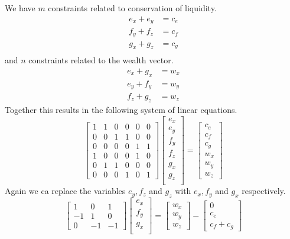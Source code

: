 \documentclass[10pt,twocolumn]{article}
\begin{document}
We have $m$ constraints related to conservation of liquidity.
\begin{align*}
  e_x + e_y  & = c_e \\
  f_y + f_z & = c_f \\
  g_x + g_z & = c_g \\
\end{align*}
and $n$ constraints related to the wealth vector.
\begin{align*}
  e_x +  g_x & = w_x \\
  e_y +  f_y & = w_y \\
  f_z +  g_z & = w_z
\end{align*}
Together this results in the following system of linear equations.
\[
  \left[
    \begin{array}{cccccc}
      1 & 1 & 0 & 0 & 0 & 0 \\
      0 & 0 & 1 & 1 & 0 & 0 \\
      0 & 0 & 0 & 0 & 1 & 1 \\
      1 & 0 & 0 & 0 & 1 & 0 \\
      0 & 1 & 1 & 0 & 0 & 0 \\
      0 & 0 & 0 & 1 & 0 & 1 
    \end{array}
    \right]
\begin{bmatrix}
  e_{x}  \\
  e_{y}  \\
  f_{y}  \\
  f_{z}  \\
  g_{x}  \\
  g_{z}  \\
\end{bmatrix} 
  = \begin{bmatrix}
  c_e\\
  c_f\\
  c_g\\
  w_x\\
  w_y\\
  w_z
\end{bmatrix}
\]
Again we ca replace the variables $e_y, f_z$ and $g_z$ with $e_x, f_y$ and $g_x$ respectively. 
\[
  \left[
    \begin{array}{ccc}
      1 & 0 & 1 \\
      - 1& 1 & 0 \\
      0 & -1 & -1 
    \end{array}
    \right]
\begin{bmatrix}
  e_{x}  \\
  f_{y}  \\
  g_{x}  \\
\end{bmatrix} 
  = \begin{bmatrix}
  w_x\\
  w_y\\
  w_z
  \end{bmatrix}
  - \begin{bmatrix}
  0\\
  c_e\\
  c_f + c_g
  \end{bmatrix}
\]
\end{document}
